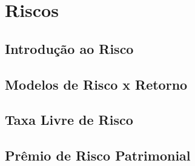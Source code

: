\chapter{Riscos}
\section{Introdução ao Risco}

\section{Modelos de Risco x Retorno}

\section{Taxa Livre de Risco}

\section{Prêmio de Risco Patrimonial}
